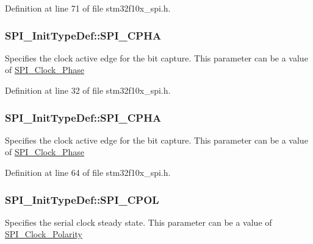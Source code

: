 Definition at line 71 of file stm32f10x\+\_\+spi.\+h.

\subsubsection[{\texorpdfstring{S\+P\+I\+\_\+\+C\+P\+HA}{SPI_CPHA}}]{ S\+P\+I\+\_\+\+Init\+Type\+Def\+::\+S\+P\+I\+\_\+\+C\+P\+HA}\hypertarget{struct_s_p_i___init_type_def_ae6552fad0ed194463d62e93e658c78e1}{}\label{struct_s_p_i___init_type_def_ae6552fad0ed194463d62e93e658c78e1}
Specifies the clock active edge for the bit capture. This parameter can be a value of \hyperlink{group___s_p_i___clock___phase}{S\+P\+I\+\_\+\+Clock\+\_\+\+Phase} 

Definition at line 32 of file stm32f10x\+\_\+spi.\+h.

\subsubsection[{\texorpdfstring{S\+P\+I\+\_\+\+C\+P\+HA}{SPI_CPHA}}]{ S\+P\+I\+\_\+\+Init\+Type\+Def\+::\+S\+P\+I\+\_\+\+C\+P\+HA}\hypertarget{struct_s_p_i___init_type_def_acdaac9259c45f137e804f90122edb129}{}\label{struct_s_p_i___init_type_def_acdaac9259c45f137e804f90122edb129}
Specifies the clock active edge for the bit capture. This parameter can be a value of \hyperlink{group___s_p_i___clock___phase}{S\+P\+I\+\_\+\+Clock\+\_\+\+Phase} 

Definition at line 64 of file stm32f10x\+\_\+spi.\+h.

\subsubsection[{\texorpdfstring{S\+P\+I\+\_\+\+C\+P\+OL}{SPI_CPOL}}]{ S\+P\+I\+\_\+\+Init\+Type\+Def\+::\+S\+P\+I\+\_\+\+C\+P\+OL}\hypertarget{struct_s_p_i___init_type_def_a88634bd8cb69b459fec84d421affa14d}{}\label{struct_s_p_i___init_type_def_a88634bd8cb69b459fec84d421affa14d}
Specifies the serial clock steady state. This parameter can be a value of \hyperlink{group___s_p_i___clock___polarity}{S\+P\+I\+\_\+\+Clock\+\_\+\+Polarity} 

